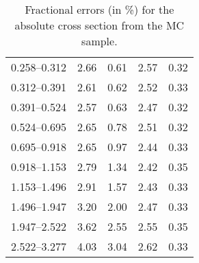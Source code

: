 \begin{table}
\begin{center}
\begin{tabular}{@{}l l l l l@{}}
            0.258--0.312 & 2.66 & 0.61 & 2.57 & 0.32  \\
            0.312--0.391 & 2.61 & 0.62 & 2.52 & 0.33  \\
            0.391--0.524 & 2.57 & 0.63 & 2.47 & 0.32  \\
            0.524--0.695 & 2.65 & 0.78 & 2.51 & 0.32  \\
            0.695--0.918 & 2.65 & 0.97 & 2.44 & 0.33  \\
            0.918--1.153 & 2.79 & 1.34 & 2.42 & 0.35  \\
            1.153--1.496 & 2.91 & 1.57 & 2.43 & 0.33  \\
            1.496--1.947 & 3.20 & 2.00 & 2.47 & 0.33  \\
            1.947--2.522 & 3.62 & 2.55 & 2.55 & 0.35  \\
            2.522--3.277 & 4.03 & 3.04 & 2.62 & 0.33  \\
            \bottomrule
        \end{tabular}
    \end{center}
    \caption{
        Fractional errors (in \%) for the absolute cross section from the
        \POWHEG MC sample.
    }
    \label{tab:powheg_uncert_abs}
\end{table}
